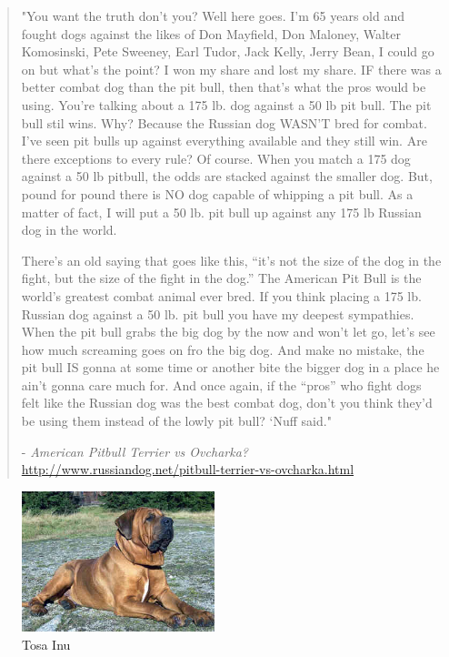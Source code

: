 \blockquote{"You want the truth don’t you? Well here goes. I’m 65 years old and fought dogs against the likes of Don Mayfield, Don Maloney, Walter Komosinski, Pete Sweeney, Earl Tudor, Jack Kelly, Jerry Bean, I could go on but what’s the point? I won my share and lost my share. IF there was a better combat dog than the pit bull, then that’s what the pros would be using. You’re talking about a 175 lb. dog against a 50 lb pit bull. The pit bull stil wins. Why? Because the Russian dog WASN’T bred for combat. I’ve seen pit bulls up against everything available and they still win. Are there exceptions to every rule? Of course. When you match a 175 dog against a 50 lb pitbull, the odds are stacked against the smaller dog. But, pound for pound there is NO dog capable of whipping a pit bull. As a matter of fact, I will put a 50 lb. pit bull up against any 175 lb Russian dog in the world. \

There’s an old saying that goes like this, “it’s not the size of the dog in the fight, but the size of the fight in the dog.” The American Pit Bull is the world’s greatest combat animal ever bred. If you think placing a 175 lb. Russian dog against a 50 lb. pit bull you have my deepest sympathies. When the pit bull grabs the big dog by the now and won’t let go, let’s see how much screaming goes on fro the big dog. And make no mistake, the pit bull IS gonna at some time or another bite the bigger dog in a place he ain’t gonna care much for. And once again, if the “pros” who fight dogs felt like the Russian dog was the best combat dog, don’t you think they’d be using them instead of the lowly pit bull? ‘Nuff said."\

- \textit{American Pitbull Terrier vs Ovcharka?} \url{http://www.russiandog.net/pitbull-terrier-vs-ovcharka.html}
\label{pitbullQuote}}

\begin{figure} 
	\centering
    \includegraphics[width=0.5\textwidth]{tosa.jpg}
    \caption{Tosa Inu}
    \label{fig:tosa}
\end{figure}

